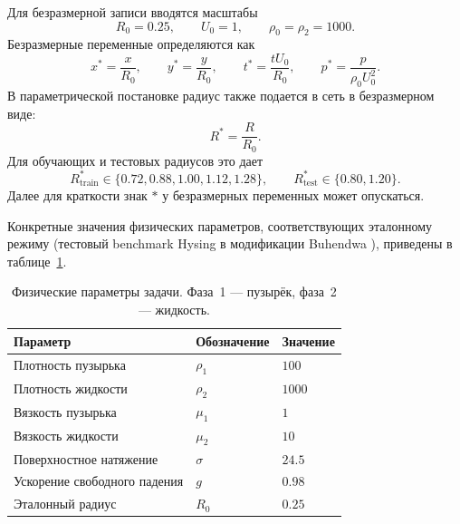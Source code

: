 \documentclass[12pt,a4paper]{article}
\newcommand{\Rbase}{R_0}
\newcommand{\Uref}{U_0}
\newcommand{\rhoref}{\rho_0}
\begin{document}
Для безразмерной записи вводятся масштабы
\[
    \Rbase=0.25,\qquad \Uref=1,\qquad \rhoref=\rho_2=1000.
\]
Безразмерные переменные определяются как
\[
    x^*=\frac{x}{\Rbase},\qquad
    y^*=\frac{y}{\Rbase},\qquad
    t^*=\frac{t\Uref}{\Rbase},\qquad
    p^*=\frac{p}{\rhoref \Uref^2}.
\]
В параметрической постановке радиус также подается в сеть в безразмерном виде:
\[
    R^*=\frac{R}{\Rbase}.
\]
Для обучающих и тестовых радиусов это дает
\[
    R^*_{\mathrm{train}}\in\{0.72,0.88,1.00,1.12,1.28\},
    \qquad
    R^*_{\mathrm{test}}\in\{0.80,1.20\}.
\]
Далее для краткости знак \(*\) у безразмерных переменных может опускаться.

Конкретные значения физических параметров, соответствующих эталонному режиму
(тестовый benchmark Hysing \cite{Hysing2009} в модификации Buhendwa
\cite{Buhendwa2021}), приведены в таблице~\ref{tab:params}.

\begin{table}[H]
\centering
\caption{Физические параметры задачи. Фаза~1 --- пузырёк, фаза~2 --- жидкость.}
\label{tab:params}
\begin{tabular}{lll}
\hline
Параметр & Обозначение & Значение \\
\hline
Плотность пузырька   & $\rho_1$ & $100$ \\
Плотность жидкости   & $\rho_2$ & $1000$ \\
Вязкость пузырька    & $\mu_1$  & $1$ \\
Вязкость жидкости    & $\mu_2$  & $10$ \\
Поверхностное натяжение & $\sigma$ & $24.5$ \\
Ускорение свободного падения & $g$ & $0.98$ \\
Эталонный радиус     & $R_0$    & $0.25$ \\
\hline
\end{tabular}
\end{table}
\end{document}

